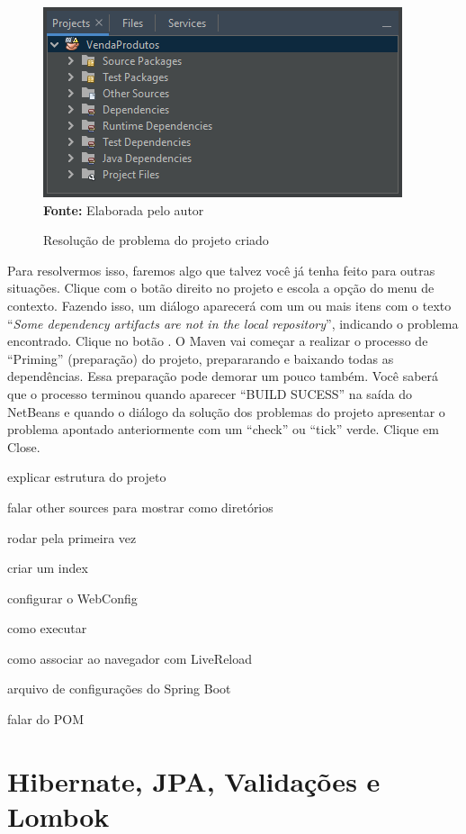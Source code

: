 \FloatBarrier
\begin{figure}[!htbp]
    \centering
    \caption{Resolução de problema do projeto criado}
    \includegraphics[scale=1]{imagens/cap10ConfProjeto03}
    \\\textbf{Fonte:} Elaborada pelo autor
    \label{fig:cap10ConfProjeto03}
\end{figure}
\FloatBarrier

Para resolvermos isso, faremos algo que talvez você já tenha feito para outras situações. Clique com o botão direito no projeto e escola a opção  do menu de contexto. Fazendo isso, um diálogo aparecerá com um ou mais itens com o texto ``\textit{Some dependency artifacts are not in the local repository}'', indicando o problema encontrado. Clique no botão . O Maven vai começar a realizar o processo de ``Priming'' (preparação) do projeto, prepararando e baixando todas as dependências. Essa preparação pode demorar um pouco também. Você saberá que o processo terminou quando aparecer ``BUILD SUCESS'' na saída do NetBeans e quando o diálogo da solução dos problemas do projeto apresentar o problema apontado anteriormente com um ``check'' ou ``tick'' verde. Clique em Close.

explicar estrutura do projeto

falar  other sources para mostrar como diretórios

rodar pela primeira vez

criar um index

configurar o WebConfig

como executar

como associar ao navegador com LiveReload

arquivo de configurações do Spring Boot

falar do POM


\section{Hibernate, JPA, Validações e Lombok}

